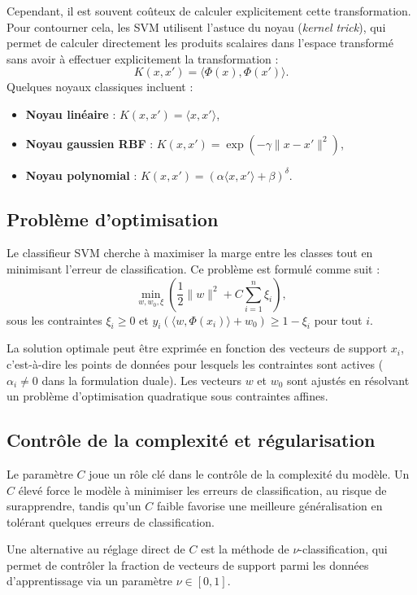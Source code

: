 \documentclass[12pt,a4paper]{report}
\begin{document}
Cependant, il est souvent coûteux de calculer explicitement cette transformation. Pour contourner cela, les SVM utilisent l'astuce du noyau (\textit{kernel trick}), qui permet de calculer directement les produits scalaires dans l'espace transformé sans avoir à effectuer explicitement la transformation :
\[
K(x, x') = \langle \Phi(x), \Phi(x') \rangle.
\]
Quelques noyaux classiques incluent :
\begin{itemize}
    \item \textbf{Noyau linéaire} : \( K(x, x') = \langle x, x' \rangle \),
    \item \textbf{Noyau gaussien RBF} : \( K(x, x') = \exp(-\gamma \| x - x' \|^2) \),
    \item \textbf{Noyau polynomial} : \( K(x, x') = (\alpha \langle x, x' \rangle + \beta)^\delta \).
\end{itemize}

\subsection{Problème d'optimisation}

Le classifieur SVM cherche à maximiser la marge entre les classes tout en minimisant l'erreur de classification. Ce problème est formulé comme suit :
\[
\min_{w, w_0, \xi} \left( \frac{1}{2} \| w \|^2 + C \sum_{i=1}^n \xi_i \right),
\]
sous les contraintes \( \xi_i \geq 0 \) et \( y_i (\langle w, \Phi(x_i) \rangle + w_0) \geq 1 - \xi_i \) pour tout \( i \).

La solution optimale peut être exprimée en fonction des vecteurs de support \( x_i \), c’est-à-dire les points de données pour lesquels les contraintes sont actives ( \( \alpha_i \neq 0 \) dans la formulation duale). Les vecteurs \( w \) et \( w_0 \) sont ajustés en résolvant un problème d'optimisation quadratique sous contraintes affines.

\subsection{Contrôle de la complexité et régularisation}

Le paramètre \( C \) joue un rôle clé dans le contrôle de la complexité du modèle. Un \( C \) élevé force le modèle à minimiser les erreurs de classification, au risque de surapprendre, tandis qu'un \( C \) faible favorise une meilleure généralisation en tolérant quelques erreurs de classification.

Une alternative au réglage direct de \( C \) est la méthode de \(\nu\)-classification, qui permet de contrôler la fraction de vecteurs de support parmi les données d'apprentissage via un paramètre \( \nu \in [0, 1] \).
\end{document}
